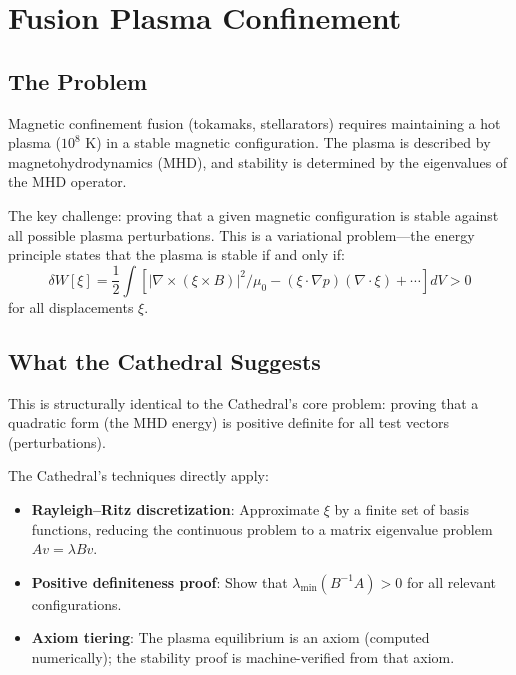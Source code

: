\documentclass[11pt,a4paper]{article}
\begin{document}
\section{Fusion Plasma Confinement}
\label{sec:fusion}

\subsection{The Problem}

Magnetic confinement fusion (tokamaks, stellarators) requires
maintaining a hot plasma ($10^8$ K) in a stable magnetic
configuration. The plasma is described by magnetohydrodynamics (MHD),
and stability is determined by the eigenvalues of the MHD operator.

The key challenge: proving that a given magnetic configuration is
stable against all possible plasma perturbations. This is a
variational problem---the energy principle states that the plasma
is stable if and only if:
\[
  \delta W[\xi] = \frac{1}{2} \int \left[
  |\nabla \times (\xi \times B)|^2 / \mu_0 -
  (\xi \cdot \nabla p)(\nabla \cdot \xi) + \cdots
  \right] dV > 0
\]
for all displacements $\xi$.

\subsection{What the Cathedral Suggests}

This is structurally identical to the Cathedral's core problem:
proving that a quadratic form (the MHD energy) is positive definite
for all test vectors (perturbations).

The Cathedral's techniques directly apply:
\begin{itemize}
  \item \textbf{Rayleigh--Ritz discretization}: Approximate $\xi$
    by a finite set of basis functions, reducing the continuous
    problem to a matrix eigenvalue problem $Av = \lambda Bv$.
  \item \textbf{Positive definiteness proof}: Show that
    $\lambda_{\min}(B^{-1}A) > 0$ for all relevant configurations.
  \item \textbf{Axiom tiering}: The plasma equilibrium is an axiom
    (computed numerically); the stability proof is machine-verified
    from that axiom.
\end{itemize}
\end{document}
